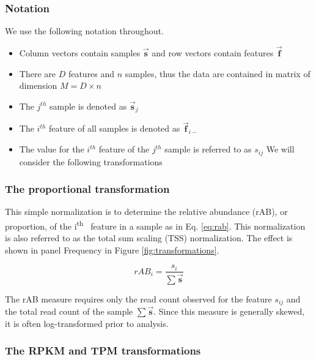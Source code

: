 \documentclass[
  onecolumn]{article}
\providecommand{\tightlist}{%
  \setlength{\itemsep}{0pt}\setlength{\parskip}{0pt}}
\newcommand{\ith}[1]{ #1\textsuperscript{th}\ }
\begin{document}
\hypertarget{notation}{%
\subsubsection{Notation}\label{notation}}

We use the following notation throughout.

\begin{itemize}
\tightlist
\item
  Column vectors contain samples \(\vec{\textbf{s}}\) and row vectors contain features \(\vec{\textbf{f}}\)
\item
  There are \(D\) features and \(n\) samples, thus the data are contained in matrix of dimension \(M = D \times n\)
\item
  The \(j^{th}\) sample is denoted as \(\vec{\textbf{s}}_{j}\)
\item
  The \(i^{th}\) feature of all samples is denoted as \(\vec{\textbf{f}}_{i-}\)
\item
  The value for the \(i^{th}\) feature of the \(j^{th}\) sample is referred to as \(s_{ij}\)
  We will consider the following transformations
\end{itemize}

\hypertarget{the-proportional-transformation}{%
\subsubsection{The proportional transformation}\label{the-proportional-transformation}}

This simple normalization is to determine the relative abundance (rAB), or proportion, of the \ith{i} feature in a sample as in Eq. \ref{eq:rab}. This normalization is also referred to as the total sum scaling (TSS) normalization. The effect is shown in panel Frequency in Figure \ref{fig:transformations}.

\begin{equation}
    rAB_{i} = \frac{s_{i}}{\sum{\vec{\textbf{s}}}}
    \label{eq:rab}
\end{equation}

The rAB measure requires only the read count observed for the feature \(s_{ij}\) and the total read count of the sample \(\sum{\vec{\textbf{s}}}\). Since this measure is generally skewed, it is often log-transformed prior to analysis.

\hypertarget{the-rpkm-and-tpm-transformations}{%
\subsubsection{The RPKM and TPM transformations}\label{the-rpkm-and-tpm-transformations}}
\end{document}
